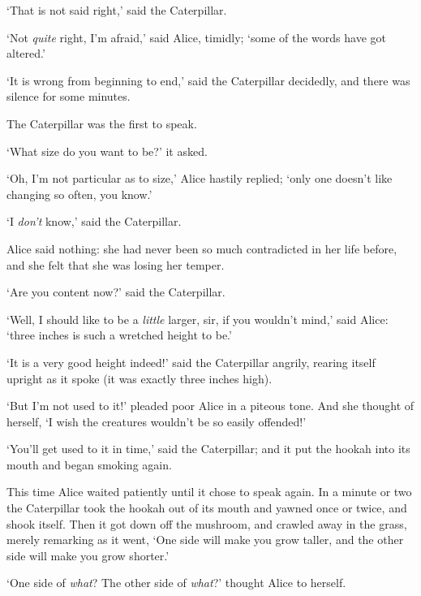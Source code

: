 \onelineskip

  `That is not said right,' said the Caterpillar.

  `Not {\it quite} right, I'm afraid,' said Alice, timidly; `some of the
words have got altered.'

  `It is wrong from beginning to end,' said the Caterpillar
decidedly, and there was silence for some minutes.

  The Caterpillar was the first to speak.

  `What size do you want to be?' it asked.

  `Oh, I'm not particular as to size,' Alice hastily replied;
`only one doesn't like changing so often, you know.'

  `I {\it don't} know,' said the Caterpillar.

  Alice said nothing:  she had never been so much contradicted in
her life before, and she felt that she was losing her temper.

  `Are you content now?' said the Caterpillar.

  `Well, I should like to be a {\it little} larger, sir, if you
wouldn't mind,' said Alice:  `three inches is such a wretched
height to be.'

  `It is a very good height indeed!' said the Caterpillar
angrily, rearing itself upright as it spoke (it was exactly three
inches high).

  `But I'm not used to it!' pleaded poor Alice in a piteous tone.
And she thought of herself, `I wish the creatures wouldn't be so
easily offended!'

  `You'll get used to it in time,' said the Caterpillar; and it
put the hookah into its mouth and began smoking again.

  This time Alice waited patiently until it chose to speak again.
In a minute or two the Caterpillar took the hookah out of its
mouth and yawned once or twice, and shook itself.  Then it got
down off the mushroom, and crawled away in the grass, merely
remarking as it went, `One side will make you grow taller, and
the other side will make you grow shorter.'

  `One side of {\it what}?  The other side of {\it what}?' thought Alice to
herself.

